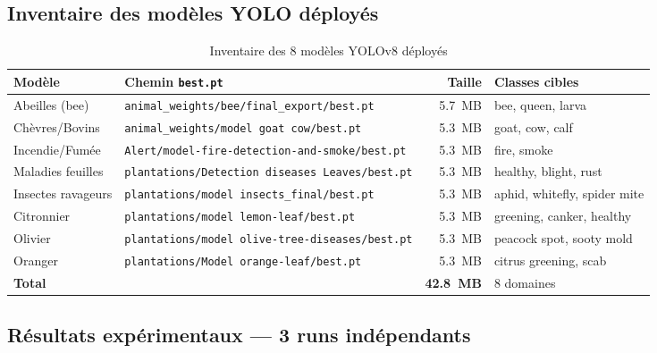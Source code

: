 \documentclass[12pt,a4paper,twoside]{report}
\newcounter{hi}
\begin{document}
\subsection*{Inventaire des modèles YOLO déployés}

\begin{table}[H]
\caption{Inventaire des 8 modèles YOLOv8 déployés}
\label{tab:yolo_models}
\centering
\small
\begin{tabularx}{\textwidth}{@{}l X r l@{}}
\toprule
\textbf{Modèle} & \textbf{Chemin \texttt{best.pt}} & \textbf{Taille} & \textbf{Classes cibles} \\
\midrule
Abeilles (bee)       & \texttt{animal\_weights/bee/final\_export/best.pt}              & 5.7~MB & bee, queen, larva \\
Chèvres/Bovins       & \texttt{animal\_weights/model goat cow/best.pt}                & 5.3~MB & goat, cow, calf \\
Incendie/Fumée       & \texttt{Alert/model-fire-detection-and-smoke/best.pt}          & 5.3~MB & fire, smoke \\
Maladies feuilles    & \texttt{plantations/Detection diseases Leaves/best.pt}         & 5.3~MB & healthy, blight, rust \\
Insectes ravageurs   & \texttt{plantations/model insects\_final/best.pt}              & 5.3~MB & aphid, whitefly, spider mite \\
Citronnier           & \texttt{plantations/model lemon-leaf/best.pt}                  & 5.3~MB & greening, canker, healthy \\
Olivier              & \texttt{plantations/model olive-tree-diseases/best.pt}         & 5.3~MB & peacock spot, sooty mold \\
Oranger              & \texttt{plantations/Model orange-leaf/best.pt}                 & 5.3~MB & citrus greening, scab \\
\midrule
\multicolumn{2}{l}{\textbf{Total}} & \textbf{42.8~MB} & 8 domaines \\
\bottomrule
\end{tabularx}
\end{table}

\subsection{Résultats expérimentaux — 3 runs indépendants}
\end{document}
